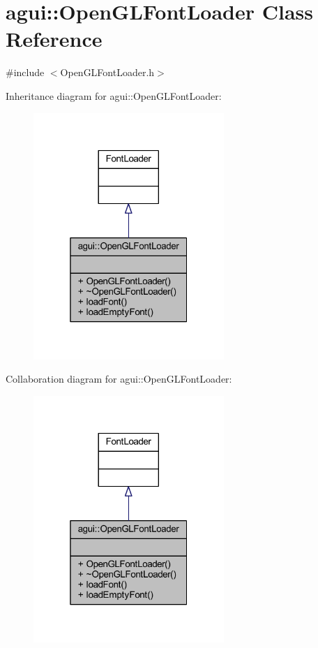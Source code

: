 \hypertarget{classagui_1_1_open_g_l_font_loader}{}\section{agui\+:\+:Open\+G\+L\+Font\+Loader Class Reference}
\label{classagui_1_1_open_g_l_font_loader}


{\ttfamily \#include $<$Open\+G\+L\+Font\+Loader.\+h$>$}



Inheritance diagram for agui\+:\+:Open\+G\+L\+Font\+Loader\+:
\nopagebreak
\begin{figure}[H]
\begin{center}
\leavevmode
\includegraphics[width=205pt]{classagui_1_1_open_g_l_font_loader__inherit__graph}
\end{center}
\end{figure}


Collaboration diagram for agui\+:\+:Open\+G\+L\+Font\+Loader\+:
\nopagebreak
\begin{figure}[H]
\begin{center}
\leavevmode
\includegraphics[width=205pt]{classagui_1_1_open_g_l_font_loader__coll__graph}
\end{center}
\end{figure}

